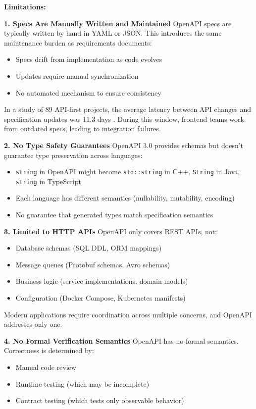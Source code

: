 \textbf{Limitations:}

\textbf{1. Specs Are Manually Written and Maintained}
OpenAPI specs are typically written by hand in YAML or JSON. This introduces the same maintenance burden as requirements documents:
\begin{itemize}
    \item Specs drift from implementation as code evolves
    \item Updates require manual synchronization
    \item No automated mechanism to ensure consistency
\end{itemize}

In a study of 89 API-first projects, the average latency between API changes and specification updates was 11.3 days \cite{swagger2020survey}. During this window, frontend teams work from outdated specs, leading to integration failures.

\textbf{2. No Type Safety Guarantees}
OpenAPI 3.0 provides schemas but doesn't guarantee type preservation across languages:
\begin{itemize}
    \item \texttt{string} in OpenAPI might become \texttt{std::string} in C++, \texttt{String} in Java, \texttt{string} in TypeScript
    \item Each language has different semantics (nullability, mutability, encoding)
    \item No guarantee that generated types match specification semantics
\end{itemize}

\textbf{3. Limited to HTTP APIs}
OpenAPI only covers REST APIs, not:
\begin{itemize}
    \item Database schemas (SQL DDL, ORM mappings)
    \item Message queues (Protobuf schemas, Avro schemas)
    \item Business logic (service implementations, domain models)
    \item Configuration (Docker Compose, Kubernetes manifests)
\end{itemize}

Modern applications require coordination across multiple concerns, and OpenAPI addresses only one.

\textbf{4. No Formal Verification Semantics}
OpenAPI has no formal semantics. Correctness is determined by:
\begin{itemize}
    \item Manual code review
    \item Runtime testing (which may be incomplete)
    \item Contract testing (which tests only observable behavior)
\end{itemize}

